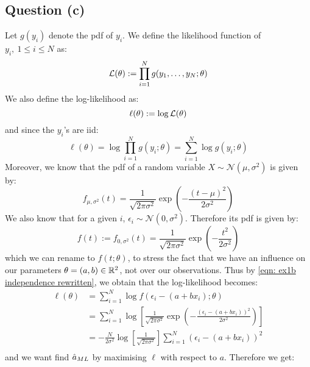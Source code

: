 \documentclass[12pt]{article}
\begin{document}
\subsection{Question (c)}
Let \(g(y_i)\) denote the \gls{pdf} of \(y_i\). We define the likelihood function of \(y_i, \ 1 \leq i \leq N\) as:
\begin{equation*}
    \mathcal{L}(\theta) := \prod_{i=1}^N g(y_1, \ldots, y_N ; \theta)
\end{equation*}
We also define the log-likelihood as:
\begin{equation*}
    \ell(\theta) := \log \mathcal{L}(\theta)
\end{equation*}
and since the \(y_i\)'s are \gls{iid}:
\begin{equation*}
    \ell(\theta) = \log \prod_{i=1}^N g(y_i ; \theta) = \sum_{i=1}^N \log g(y_i ; \theta)
\end{equation*}
Moreover, we know that the \gls{pdf} of a random variable \(X \sim \mathcal{N}(\mu, \sigma^2)\) is given by:
\begin{equation*}
    f_{\mu, \sigma^2}(t)=\frac{1}{\sqrt{2 \pi \sigma^{2}}} \exp \left(-\frac{(t-\mu)^{2}}{2 \sigma^{2}}\right)
\end{equation*}
We also know that for a given \(i\), \(\epsilon_i  \sim \mathcal{N}(0, \sigma^2)\). Therefore its \gls{pdf} is given by:
\begin{equation*}
    f(t) := f_{0, \sigma^2}(t) = \frac{1}{\sqrt{2 \pi \sigma^{2}}} \exp \left(-\frac{t^{2}}{2 \sigma^{2}}\right)
\end{equation*}
which we can rename to \(f(t; \theta)\), to stress the fact that we have an influence on our parameters \(\theta = (a, b) \in \mathbb{R}^2\), not over our observations.
Thus by \eqref{eqn: ex1b independence rewritten}, we obtain that the log-likelihood becomes:
\begin{align*}
    \ell(\theta)
     & = \sum_{i=1}^N \log f(\epsilon_i - (a + bx_i) ; \theta)                                                                                             \\
     & = \sum_{i=1}^N \log \left[\frac{1}{\sqrt{2 \pi \sigma^{2}}} \exp \left(-\frac{\left(\epsilon_i - (a + bx_i)\right)^{2}}{2 \sigma^{2}}\right)\right] \\
     & = -\frac{N}{2 \sigma^2}\log \left[\frac{1}{\sqrt{2 \pi \sigma^{2}}}\right] \sum_{i=1}^N \left(\epsilon_i - (a + bx_i)\right)^{2}                    \\
\end{align*}
and we want find \(\hat a_{ML}\) by maximising \(\ell\) with respect to \(a\). Therefore we get:
\end{document}
